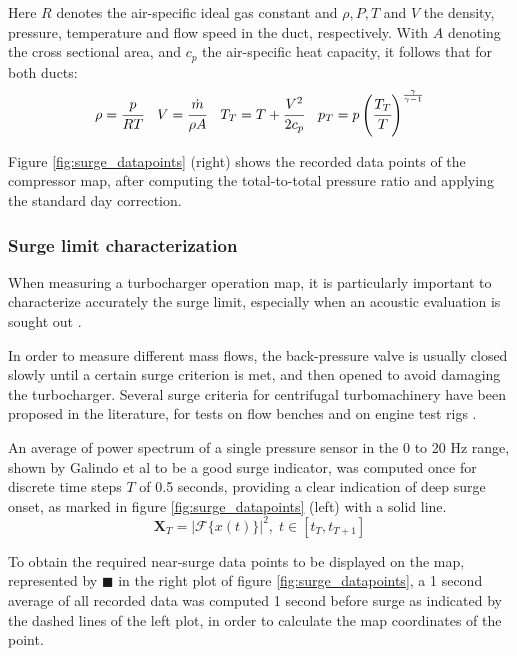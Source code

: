 Here $R$ denotes the air-specific ideal gas constant and $\rho,P,T$ and $V$ the density, pressure, temperature and flow speed in the duct, respectively. With $A$ denoting the cross sectional area, and $c_p$ the air-specific heat capacity, it follows that for both ducts:
\begin{equation}
    \rho =\cfrac{p}{RT} \quad
    V =\cfrac{\dot m}{\rho A} \quad
    T_{T}=T+\cfrac{V^2}{2c_p} \quad
    p_{T}=p\left(\cfrac{T_{T}}{T}\right)^\frac{\gamma}{\gamma-1}
\end{equation}

Figure \ref{fig:surge_datapoints} (right) shows the recorded data points of the compressor map, after computing the total-to-total pressure ratio and
applying the standard day correction.

\subsubsection{Surge limit characterization}
\label{sub:surge_limit_characterization}

When measuring a turbocharger operation map, it is particularly important to  characterize accurately the surge limit, especially when an acoustic evaluation is sought out \cite{galindo2006surge}.

In order to measure different mass flows, the back-pressure valve is usually closed slowly until a certain surge criterion is met, and then opened to avoid damaging the turbocharger. Several surge criteria for centrifugal turbomachinery have been proposed in the literature, for tests on flow benches \cite{galindo2006surge} and on engine test rigs \cite{galindo2013engine}.

An average of power spectrum of a single pressure sensor in the 0 to 20 Hz range, shown by Galindo et al \cite{galindo2006surge} to be a good surge indicator, was computed once for discrete time steps $T$ of 0.5 seconds, providing a clear indication of deep surge onset, as marked in figure \ref{fig:surge_datapoints} (left) with a solid line.
\begin{equation}
 \mathbf X_T=\left|\mathcal F\{x(t)\}\right|^2,\; t\in[t_T,t_{T+1}]
\end{equation}

To obtain the required near-surge data points to be displayed on the map, represented by $\blacksquare$ in the right plot of figure \ref{fig:surge_datapoints}, a 1 second average of all recorded data was computed 1 second before surge as indicated by the dashed lines of the left plot, in order to calculate the map coordinates of the point.

